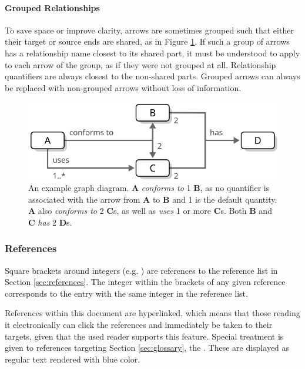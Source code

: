 \paragraph{Grouped Relationships}
To save space or improve clarity, arrows are sometimes grouped such that either their target or source ends are shared, as in Figure \ref{fig:graph-diagram}.
If such a group of arrows has a relationship name closest to its shared part, it must be understood to apply to each arrow of the group, as if they were not grouped at all.
Relationship quantifiers are always closest to the non-shared parts.
Grouped arrows can always be replaced with non-grouped arrows without loss of information.

\vfill

\begin{figure}[ht!]
  \centering
  \includegraphics[scale=0.9]{figures/graph-diagram}
  \caption{
    An example graph diagram.
    \textbf{A} \textit{conforms to} 1 \textbf{B}, as no quantifier is associated with the arrow from \textbf{A} to \textbf{B} and 1 is the default quantity.
    \textbf{A} also \textit{conforms to} 2 \textbf{C}s, as well as \textit{uses} 1 or more \textbf{C}s.
    Both \textbf{B} and \textbf{C} \textit{has} 2 \textbf{D}s.
  }
  \label{fig:graph-diagram}
\end{figure}

\subsubsection{References}

Square brackets around integers (e.g. \cite{delsing2017iot}) are references to the reference list in Section \ref{sec:references}.
The integer within the brackets of any given reference corresponds to the entry with the same integer in the reference list.

References within this document are hyperlinked, which means that those reading it electronically can click the references and immediately be taken to their targets, given that the used reader supports this feature.
Special treatment is given to references targeting Section \ref{sec:glossary}, the .
These are displayed as regular text rendered with blue color.

